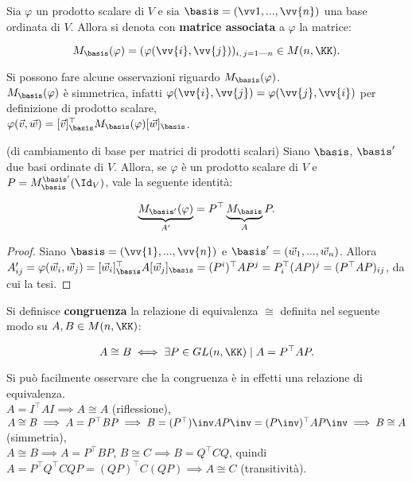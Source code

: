 \documentclass[11pt]{article}
\begin{document}
	\begin{definition}
		Sia $\varphi$ un prodotto scalare di $V$ e sia $\basis = (\vv1, ..., \vv{n})$ una base ordinata di $V$. Allora si denota con \textbf{matrice associata}
		a $\varphi$ la matrice:
		
		\[ M_\basis(\varphi) = (\varphi(\vv{i}, \vv{j}))_{i,\,j = 1\text{---}n} \in M(n, \KK). \] 
	\end{definition}

	\begin{remark}
		Si possono fare alcune osservazioni riguardo $M_\basis(\varphi)$. \\
		
		\li $M_\basis(\varphi)$ è simmetrica, infatti $\varphi(\vv{i}, \vv{j}) = \varphi(\vv{j}, \vv{i})$ per
		definizione di prodotto scalare, \\
		\li $\varphi(\vec{v}, \vec{w}) = [\vec{v}]_\basis^\top M_\basis(\varphi) [\vec{w}]_\basis$.
	\end{remark}

	\begin{theorem} (di cambiamento di base per matrici di prodotti scalari) Siano $\basis$, $\basis'$ due
		basi ordinate di $V$. Allora, se $\varphi$ è un prodotto scalare di $V$ e $P = M^{\basis'}_{\basis}(\Id_V)$, vale la seguente identità:
		
		\[ \underbrace{M_{\basis'}(\varphi)}_{A'} = P^\top \underbrace{M_{\basis}}_{A} P. \]
	\end{theorem}

	\begin{proof} Siano $\basis = (\vv{1}, ..., \vv{n})$ e $\basis' = (\vec{w}_1, ..., \vec{w}_n)$. Allora
		$A'_{ij} = \varphi(\vec{w}_i, \vec{w}_j) = [\vec{w}_i]_{\basis}^\top A [\vec{w}_j]_{\basis} =
		(P^i)^\top A P^j = P_i^\top (AP)^j = (P^\top AP)_{ij}$, da cui la tesi.
	\end{proof}

	\begin{definition}
		Si definisce \textbf{congruenza} la relazione di equivalenza $\cong$ definita nel seguente
		modo su $A, B \in M(n, \KK)$:
		
		\[ A \cong B \iff \exists P \in GL(n, \KK) \mid A = P^\top A P. \]
	\end{definition}

	\begin{remark}
		Si può facilmente osservare che la congruenza è in effetti una relazione di equivalenza. \\
		
		\li $A = I^\top A I \implies A \cong A$ (riflessione), \\
		\li $A \cong B \implies A = P^\top B P \implies B = (P^\top)\inv A P\inv = (P\inv)^\top A P\inv \implies B \cong A$ (simmetria), \\
		\li $A \cong B \implies A = P^\top B P$, $B \cong C \implies B = Q^\top C Q$, quindi $A = P^\top Q^\top C Q P =
		(QP)^\top C (QP) \implies A \cong C$ (transitività). 
	\end{remark}
\end{document}
